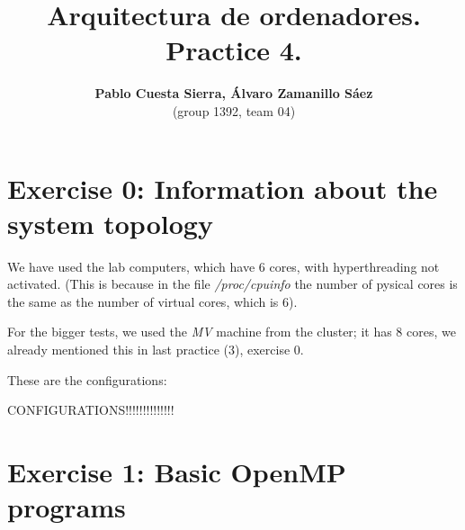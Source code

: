 \documentclass{article}
\begin{document}
\title{\textbf{Arquitectura de ordenadores. Practice 4.}}
\author{\textbf{Pablo Cuesta Sierra, Álvaro Zamanillo Sáez}\\(group 1392, team 04)}
\maketitle

\begin{tcolorbox}
\tableofcontents
\end{tcolorbox}


\newpage
\section{Exercise 0: Information about the system topology}

We have used the lab computers, which have 6 cores, with hyperthreading not activated. (This is because in the file \emph{/proc/cpuinfo} the number of pysical cores is the same as the number of virtual cores, which is 6).

For the bigger tests, we used the \emph{MV} machine from the cluster; it has 8 cores, we already mentioned this in last practice (3), exercise 0.

These are the configurations:

CONFIGURATIONS!!!!!!!!!!!!!!

\section{Exercise 1: Basic OpenMP programs}
\end{document}

